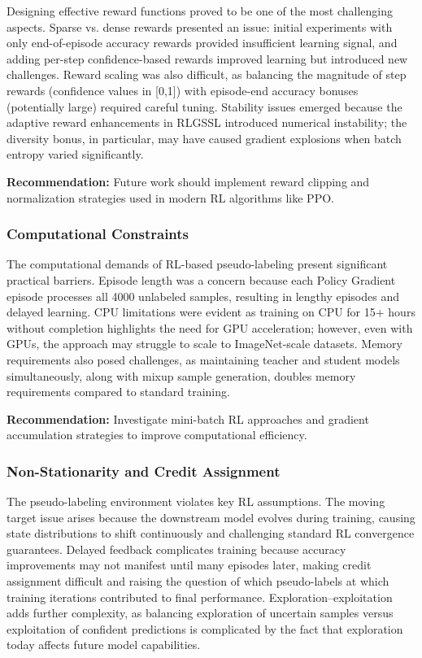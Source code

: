 \documentclass{scrartcl}
\begin{document}
Designing effective reward functions proved to be one of the most challenging aspects. Sparse vs. dense rewards presented an issue: initial experiments with only end-of-episode accuracy rewards provided insufficient learning signal, and adding per-step confidence-based rewards improved learning but introduced new challenges. Reward scaling was also difficult, as balancing the magnitude of step rewards (confidence values in [0,1]) with episode-end accuracy bonuses (potentially large) required careful tuning. Stability issues emerged because the adaptive reward enhancements in RLGSSL introduced numerical instability; the diversity bonus, in particular, may have caused gradient explosions when batch entropy varied significantly.

\textbf{Recommendation:} Future work should implement reward clipping and normalization strategies used in modern RL algorithms like PPO.

\subsubsection{Computational Constraints}

The computational demands of RL-based pseudo-labeling present significant practical barriers. Episode length was a concern because each Policy Gradient episode processes all 4000 unlabeled samples, resulting in lengthy episodes and delayed learning. CPU limitations were evident as training on CPU for 15+ hours without completion highlights the need for GPU acceleration; however, even with GPUs, the approach may struggle to scale to ImageNet-scale datasets. Memory requirements also posed challenges, as maintaining teacher and student models simultaneously, along with mixup sample generation, doubles memory requirements compared to standard training.

\textbf{Recommendation:} Investigate mini-batch RL approaches and gradient accumulation strategies to improve computational efficiency.

\subsubsection{Non-Stationarity and Credit Assignment}

The pseudo-labeling environment violates key RL assumptions. The moving target issue arises because the downstream model evolves during training, causing state distributions to shift continuously and challenging standard RL convergence guarantees. Delayed feedback complicates training because accuracy improvements may not manifest until many episodes later, making credit assignment difficult and raising the question of which pseudo-labels at which training iterations contributed to final performance. Exploration–exploitation adds further complexity, as balancing exploration of uncertain samples versus exploitation of confident predictions is complicated by the fact that exploration today affects future model capabilities.
\end{document}
